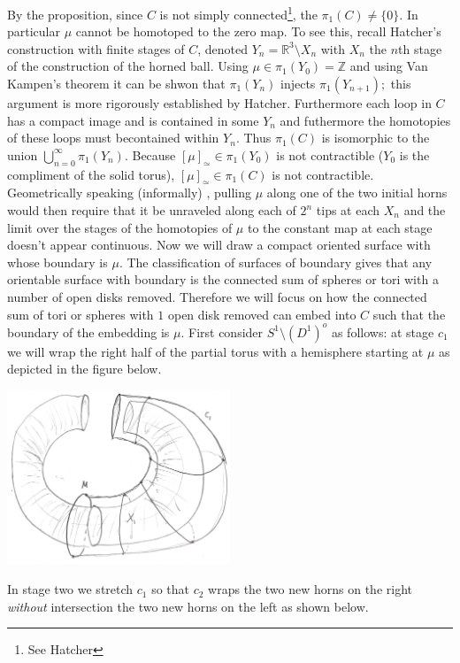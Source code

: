 \documentclass[11pt]{amsart}
\theoremstyle{definition}
\numberwithin{theorem}{section}
\numberwithin{definition}{section}
\numberwithin{equation}{section}
\begin{document}
  By the proposition, since $C$ is not simply connected\footnote{See Hatcher}, the $\pi_1(C) \neq \{0\}$. In particular $\mu$ cannot be homotoped to the zero map. To see this, 
  recall Hatcher's construction with finite stages of $C$, denoted $Y_n= \mathbb{R}^3 \setminus X_n$ with $X_n$ the $n$th stage of the construction of the horned  ball. Using $\mu \in \pi_1(Y_0) = \mathbb{Z}$ and using Van Kampen's theorem it can be shwon that $\pi_1(Y_{n})$ injects $\pi_1(Y_{n+1});$ this argument is more rigorously established by Hatcher. Furthermore each loop in $C$ has a compact image and is contained in some $Y_{n}$ and futhermore the homotopies of these loops must becontained within $Y_n$. Thus $\pi_1(C)$ is isomorphic to the union $\bigcup_{n =0}^\infty\pi_1(Y_n)$. Because $[\mu]_{\simeq} \in\pi_1(Y_0)$ is not contractible ($Y_0$ is the compliment of the solid torus), $[\mu]_{\simeq} \in \pi_1(C)$ is not contractible.  Geometrically speaking (informally) , pulling $\mu$ along one of the two initial horns would then require that it be unraveled along each of $2^n$ tips at each $X_n$ and the limit over the stages of the homotopies of $\mu$ to the constant map at each stage doesn't appear continuous.
\newpage
  Now we will draw a compact oriented surface with whose boundary is $\mu.$  The classification of surfaces of boundary gives that any orientable surface with boundary is the connected sum of spheres or tori with a number of open disks removed. Therefore we will focus on how the connected sum of tori or spheres with $1$ open disk removed can embed into $C$ such that the boundary of the embedding is $\mu$. First consider $S^1 \setminus (D^1)^o$ as follows: at stage $c_1$ we will wrap the right half of the partial torus with a hemisphere starting at $\mu$ as depicted in the figure below. 
  \begin{center}
  	\includegraphics[width=0.5\textwidth]{s2.png}
  \end{center}
  In stage two we stretch $c_1$ so that $c_2$ wraps the two new horns on the right \emph{without} intersection the two new horns on the left as shown below.
\end{document}
